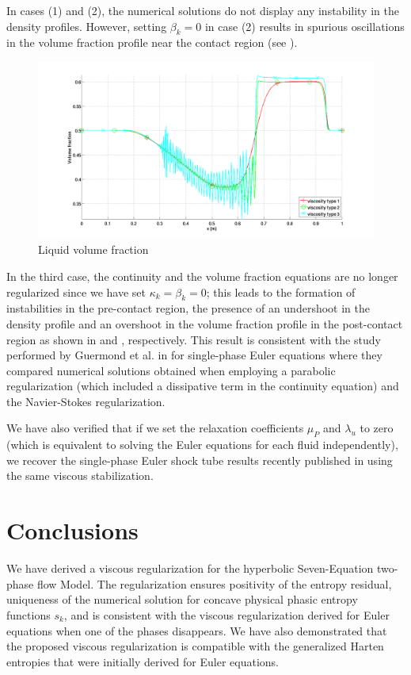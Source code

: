 \documentclass[preprint,10pt]{elsarticle}
\begin{document}
%
In cases (1) and (2), the numerical solutions do not display any instability in the density profiles. However, setting $\beta_k=0$ in case (2) results in spurious oscillations in the volume fraction profile near the contact region (see ). 
%
\begin{figure}[H]
        \centering
        \includegraphics[width=\textwidth]{figures/relaxation_liquid_vf_multiple_visc.png}
        \caption{Liquid volume fraction}
        \label{fig:liq-vf}
\end{figure}
%
In the third case, the continuity and the volume fraction equations are no longer regularized since we have set $\kappa_k=\beta_k=0$; this leads to the formation of instabilities in the pre-contact region, the presence of an undershoot in the density profile and an overshoot in the volume fraction profile in the post-contact region as shown in  and , respectively. This result is consistent with the study performed by Guermond et al. in \cite{jlg} for single-phase Euler equations where they compared numerical solutions obtained when employing a parabolic regularization (which included a dissipative term in the continuity equation) and the Navier-Stokes regularization.

We have also verified that if we set the relaxation coefficients $\mu_P$ and $\lambda_u$ to zero (which is equivalent to solving the Euler equations for each fluid independently), we recover 
the single-phase Euler shock tube results recently published in \cite{jlg1, jlg2, Marco_paper_low_mach} using the same viscous stabilization. 

%
\section{Conclusions}\label{sec:conclusion}
%
We have derived a viscous regularization for the hyperbolic Seven-Equation two-phase flow Model. The regularization ensures positivity of the entropy residual, 
uniqueness of the numerical solution for concave physical phasic entropy functions $s_k$, and is consistent with the viscous regularization derived for Euler equations 
when one of the phases disappears. 
We have also demonstrated that the proposed viscous regularization is compatible with the generalized Harten entropies that were initially derived for Euler equations. 
\end{document}
